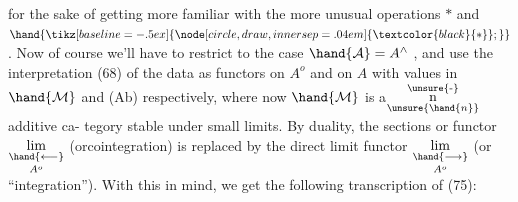 
for the sake of getting more familiar with the more unusual operations
$*$ and $\hand{\mathbin{\tikz[baseline=-.5ex]{\node[circle,draw,inner sep=.04em] {\ensuremath{\textcolor{black}{*}}};}}}$. Now of course we'll have to restrict to the case $\hand{\mathcal{A}} = A^{\wedge}$ ,
and use the interpretation (68) of the data  as functors on $A^{o}$ and on $A$
with values in $\hand{\mathcal{M}}$ and (Ab) respectively, where now $\hand{\mathcal{M}}$ is a\(\overset{\unsure{\text{-}}}{\underset{\unsure{\hand{n}}}{\text{n}}}\) additive ca-%
tegory stable under small \hand{\uline{\textcolor{black}{direct}}} limits. By duality, the sections or
 functor $\underset{A^{o}}{\underset{\hand{\longleftarrow}}{\mathrm{lim}}}$ (orcointegration) is replaced by the  direct
limit functor $\underset{A^{o}}{\underset{\hand{\longrightarrow}}{\mathrm{lim}}}$ (or ``integration''). With this in mind, we get the
following transcription of (75):

